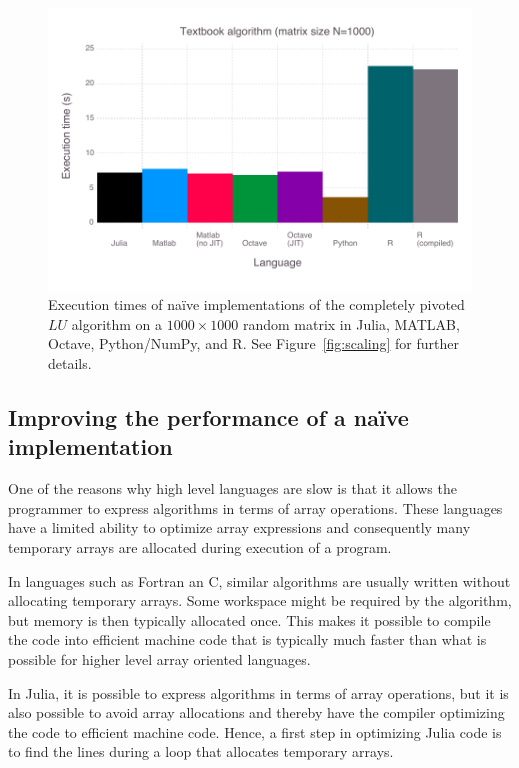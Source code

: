 \begin{figure}
	\includegraphics[width=\columnwidth]{data/fig-lang}
	\caption{Execution times of na\"ive implementations of the
	completely pivoted $LU$ algorithm on a $1000\times1000$ random matrix
	in Julia, MATLAB, Octave, Python/NumPy, and R. See Figure~\ref{fig:scaling}
	for further details.}
	\label{fig:naivelangs}
\end{figure}

\subsection{Improving the performance of a na\"ive implementation}
One of the reasons why high level languages are slow is that it allows the programmer to express algorithms in terms of array operations. These languages have a limited ability to optimize array expressions and consequently many temporary arrays are allocated during execution of a program.

In languages such as Fortran an C, similar algorithms are usually written without allocating temporary arrays. Some workspace might be required by the algorithm, but memory is then typically allocated once. This makes it possible to compile the code into efficient machine code that is typically much faster than what is possible for higher level array oriented languages.

In Julia, it is possible to express algorithms in terms of array operations, but it is also possible to avoid array allocations and thereby have the compiler optimizing the code to efficient machine code. Hence, a first step in optimizing Julia code is to find the lines during a loop that allocates temporary arrays.

